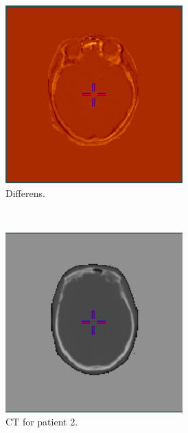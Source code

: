 \begin{figure}[H]
\begin{subfigure}[b]{0.3\textwidth}
        \centering
        \includegraphics[width=0.75\textwidth]{colager/loocv_ct/loocv_010476_sub.png}
        \caption{Differens.}
        \label{col:loocv_ct_pat1_sub}
    \end{subfigure}\\
    \begin{subfigure}[b]{0.3\textwidth}
        \centering
        \includegraphics[width=0.75\textwidth]{colager/loocv_ct/loocv_010769_ct.png}
        \caption{CT for patient 2.}
        \label{col:loocv_ct_pat2_ct}
    \end{subfigure}\hfill
    \begin{subfigure}[b]{0.3\textwidth}
        \centering

\end{subfigure}
\end{figure}
